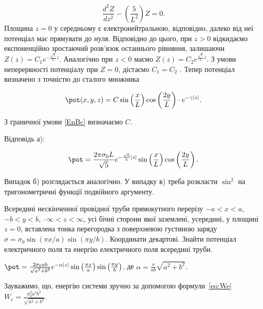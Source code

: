 \begin{problem}
\begin{solution}
\begin{equation*}
    \frac{d^2Z}{dz^2} - \left( \frac{5}{L^2}\right) Z = 0.
\end{equation*}
Площина  $z = 0$ у середньому є електронейтральною, відповідно, далеко від неї потенціал має прямувати до нуля. Відповідно до цього, при $z >0$  відкидаємо експоненційно зростаючий розв’язок останнього рівняння, залишаючи $ Z(z) = C_1  e^{-\frac{\sqrt5}{L}z} $. Аналогічно при $z < 0$  маємо $ Z(z) = C_2  e^{\frac{\sqrt5}{L}z} $. З умови неперервності потенціалу при $Z = 0$, дістаємо $C_1 = C_2$ . Тепер потенціал визначено з точністю до сталого множника


	\begin{equation*}
		\pot (x,y,z) = C \sin\left( \frac{x}{L} \right)   \cos\left( \frac{2y}{L} \right)  \cdot e^{-\gamma |z|}.
	\end{equation*}

З граничної умови \eqref{EnBc} визначаємо $C$.

Відповідь а):

	\begin{equation*}
		\pot = \frac{2\pi\sigma_0 L}{\sqrt{5}}e^{-\frac{\sqrt{5}}{L}|z|}\sin\left( \frac{x}{L}\right) \cos\left( \frac{2y}{L}\right) .
	\end{equation*}
\end{solution}

Випадок б) розглядається аналогічно. У випадку в) треба розкласти $\sin^2$ на тригонометричні функції подвійного аргументу.

\end{problem}

\begin{problem}
Всередині нескінченної провідної труби прямокутного перерізу $-a<x<a$, $-b<y<b$, $–\infty<z<\infty$, усі бічні сторони якої заземлені, усередині, у площині $z=0$, вставлена тонка перегородка з поверхневою густиною заряду $\sigma  = {\sigma _0}\sin (\pi x/a)\sin (\pi y/b)$. Координати декартові. Знайти потенціал електричного поля та енергію електричного поля всередині труби.
\begin{solution}
	$\pot  = \frac{{2{\sigma _0}ab}}{{\sqrt {{a^2} + {b^2}} }}{e^{ - \alpha |z|}}\sin \left( {\frac{{\pi x}}{a}} \right)\sin \left( {\frac{{\pi y}}{b}} \right)$, де $\alpha  = \frac{\pi }{{ab}}\sqrt {{a^2} + {b^2}}$.

    Зауважимо, що, енергію системи зручно за допомогою формули~\eqref{eq:We}
	$W_e =  \frac{{\sigma _0^2{a^2}{b^2}}}{{\sqrt {{a^2} + {b^2}} }}$.
\end{solution}
\end{problem}

